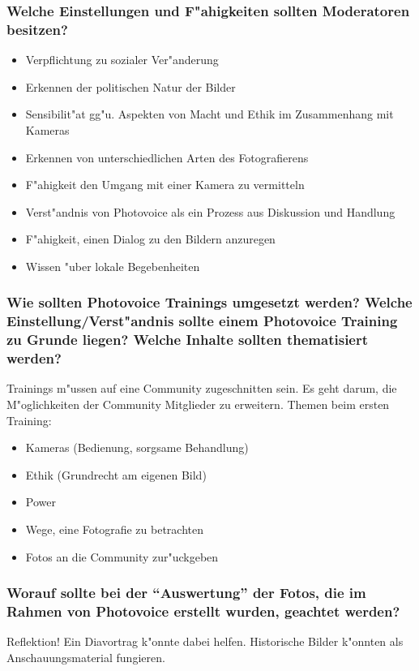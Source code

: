 \subsubsection{Welche Einstellungen und F"ahigkeiten sollten Moderatoren besitzen?}
\begin{itemize}
        \item Verpflichtung zu sozialer Ver"anderung
        \item Erkennen der politischen Natur der Bilder
        \item Sensibilit"at gg"u. Aspekten von Macht und Ethik im Zusammenhang mit Kameras
        \item Erkennen von unterschiedlichen Arten des Fotografierens
        \item F"ahigkeit den Umgang mit einer Kamera zu vermitteln
        \item Verst"andnis von Photovoice als ein Prozess aus Diskussion und Handlung
        \item F"ahigkeit, einen Dialog zu den Bildern anzuregen
        \item Wissen "uber lokale Begebenheiten
\end{itemize}

\subsubsection{Wie sollten Photovoice Trainings umgesetzt werden? Welche Einstellung/Verst"andnis sollte einem Photovoice Training zu Grunde liegen? Welche Inhalte sollten thematisiert werden?}
Trainings m"ussen auf eine Community zugeschnitten sein. Es geht darum, die M"oglichkeiten der Community Mitglieder zu erweitern. Themen beim ersten Training: 
\begin{itemize}
        \item Kameras (Bedienung, sorgsame Behandlung)
        \item Ethik (Grundrecht am eigenen Bild)
        \item Power
        \item Wege, eine Fotografie zu betrachten
        \item Fotos an die Community zur"uckgeben
\end{itemize}

\subsubsection{Worauf sollte bei der ``Auswertung'' der Fotos, die im Rahmen von Photovoice erstellt wurden, geachtet werden?}
Reflektion! Ein Diavortrag k"onnte dabei helfen. Historische Bilder k"onnten als Anschauungsmaterial fungieren.

